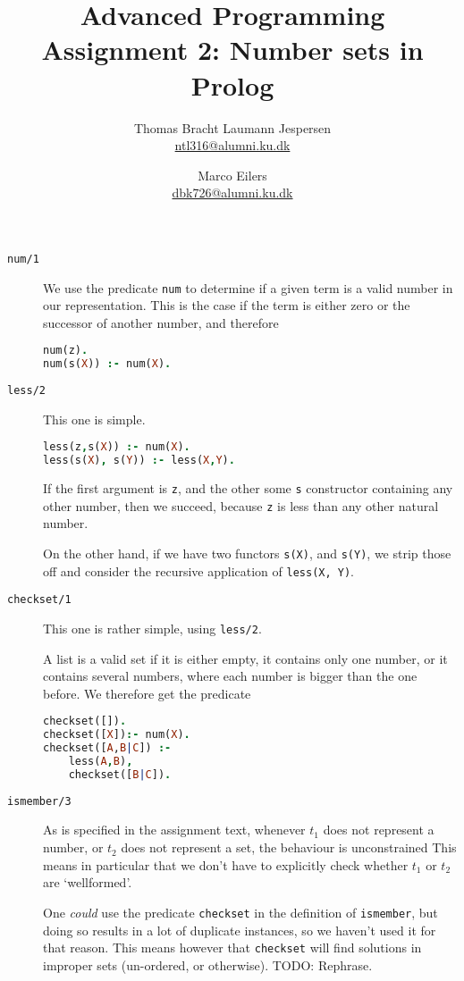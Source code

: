\documentclass[a4paper]{article}
\title{Advanced Programming\\ Assignment 2: Number sets in Prolog}
\author{Thomas Bracht Laumann Jespersen\\ \url{ntl316@alumni.ku.dk} \and Marco Eilers\\ \url{dbk726@alumni.ku.dk} }
\newcommand{\pfunc}[1]{\textnormal{\texttt{#1}}\xspace}
\newcommand{\pfuncn}[2]{\textnormal{\texttt{#1/#2}}\xspace}
\begin{document}
\maketitle

\begin{description}
\item[\pfuncn{num}{1}] We use the predicate \texttt{num} to determine if a given term is a valid number in our representation. This is the case if the term is either zero or the successor of another number, and therefore
\begin{lstlisting}[language=prolog]
num(z).
num(s(X)) :- num(X).
\end{lstlisting}
\item[\pfuncn{less}{2}] This one is simple.
\begin{lstlisting}[language=prolog]
less(z,s(X)) :- num(X).
less(s(X), s(Y)) :- less(X,Y).
\end{lstlisting}
If the first argument is \texttt{z}, and the other some \texttt{s} constructor containing any other number, then we succeed, because \texttt{z} is less than any other natural number.

On the other hand, if we have two functors \texttt{s(X)}, and \texttt{s(Y)}, we strip those off and consider the recursive application of \texttt{less(X, Y)}.
\item[\pfuncn{checkset}{1}] This one is rather simple, using \pfuncn{less}{2}.

A list is a valid set if it is either empty, it contains only one number, or it contains several numbers, where each number is bigger than the one before.  We therefore get the predicate 
\begin{lstlisting}[language=prolog]
checkset([]).
checkset([X]):- num(X).
checkset([A,B|C]) :- 
	less(A,B), 
	checkset([B|C]).
\end{lstlisting}
\item[\pfuncn{ismember}{3}] As is specified in the assignment text, whenever $t_1$ does not represent a number, or $t_2$ does not represent a set, the behaviour is unconstrained %
  This means in particular that we don't have to explicitly check whether $t_1$ or $t_2$ are `wellformed'.

  One \emph{could} use the predicate \pfunc{checkset} in the definition of \pfunc{ismember}, but doing so results in a lot of duplicate instances, so we haven't used it for that reason. This means however that \pfunc{checkset} will find solutions in improper sets (un-ordered, or otherwise). TODO: Rephrase.


\end{description}
\end{document}
